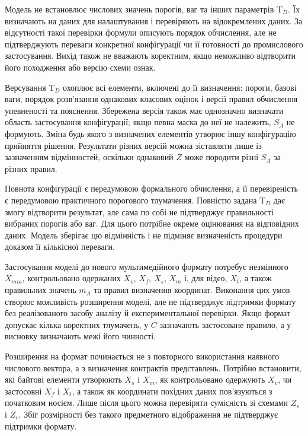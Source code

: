 Модель не встановлює числових значень порогів, ваг та інших параметрів $\mathrm T_D$. Їх визначають на даних для налаштування і перевіряють на відокремлених даних. За відсутності такої перевірки формули описують порядок обчислення, але не підтверджують переваги конкретної конфігурації чи її готовності до промислового застосування. Вихід також не вважають коректним, якщо неможливо відтворити його походження або версію схеми ознак.

Версування $\mathrm T_D$ охоплює всі елементи, включені до її визначення: пороги, базові ваги, порядок розв’язання однакових класових оцінок і версії правил обчислення упевненості та пояснення. Збережена версія також має однозначно визначати область застосування конфігурації; якщо певна маска до неї не належить, $S_A$ не формують. Зміна будь-якого з визначених елементів утворює іншу конфігурацію прийняття рішення. Результати різних версій можна зіставляти лише із зазначенням відмінностей, оскільки однаковий $Z$ може породити різні $S_A$ за різних правил.

Повнота конфігурації є передумовою формального обчислення, а її перевіреність є передумовою практичного порогового тлумачення. Повністю задана $\mathrm T_D$ дає змогу відтворити результат, але сама по собі не підтверджує правильності вибраних порогів або ваг. Для цього потрібне окреме оцінювання на відповідних даних. Модель зберігає цю відмінність і не підміняє визначеність процедури доказом її кількісної переваги.

Застосування моделі до нового мультимедійного формату потребує незмінного $X_{mm}$, контрольовано одержаних $X_v$, $X_f$, $X_s$, $X_m$ і, для відео, $X_t$, а також правильних значень $m_A$ та правил визначення координат. Виконання цих умов створює можливість розширення моделі, але не підтверджує підтримки формату без реалізованого засобу аналізу й експериментальної перевірки. Якщо формат допускає кілька коректних тлумачень, у $C$ зазначають застосоване правило, а у висновку визначають межі його чинності.

Розширення на формат починається не з повторного використання наявного числового вектора, а з визначення контрактів представлень. Потрібно встановити, які байтові елементи утворюють $X_s$ і $X_m$, як контрольовано одержують $X_v$, чи застосовні $X_f$ і $X_t$, а також як координати похідних даних пов’язуються з початковим носієм. Лише після цього можна перевіряти сумісність зі схемами $Z_s$ і $Z_v$. Збіг розмірності без такого предметного відображення не підтверджує підтримки формату.


